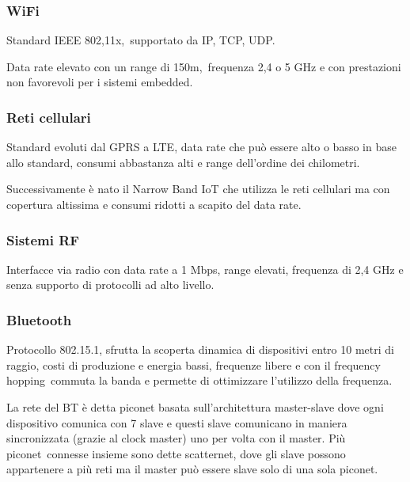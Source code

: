 \documentclass[
]{article}
\begin{document}
\subsubsection{\texorpdfstring{{WiFi}}{WiFi}}\label{h.a2b7682fwljn}

{Standard IEEE }{802,11x,}{~supportato da IP, TCP, UDP.}

{Data rate elevato con un range di }{150m,}{~frequenza 2,4 o 5 GHz e con
prestazioni non favorevoli per i sistemi embedded.}

\subsubsection{\texorpdfstring{{Reti
cellulari}}{Reti cellulari}}\label{h.r7efevy3e79i}

{Standard evoluti dal GPRS a LTE, data rate che può essere alto o basso
in base allo standard, consumi abbastanza alti e range dell'ordine dei
chilometri.}

{Successivamente è nato il Narrow Band IoT che utilizza le reti
cellulari ma con copertura altissima e consumi ridotti a scapito del
data rate.}

\subsubsection{\texorpdfstring{{Sistemi
RF}}{Sistemi RF}}\label{h.wzjt7hjt8fxp}

{Interfacce via radio con data rate a 1 Mbps, range elevati, frequenza
di 2,4 GHz e senza supporto di protocolli ad alto livello.}

\subsubsection{\texorpdfstring{{Bluetooth}}{Bluetooth}}\label{h.fy1dhv4tojr8}

{Protocollo 802.15.1, sfrutta la scoperta dinamica di dispositivi entro
10 metri di raggio, costi di produzione e energia bassi, frequenze
libere e con }{il frequency hopping}{~commuta la banda e }{permette di
ottimizzare l'utilizzo della frequenza}{.}

{La rete del BT è detta piconet basata sull'architettura master-slave
dove ogni dispositivo comunica con 7 slave e questi slave comunicano in
maniera sincronizzata (grazie al clock master) uno per volta con il
master. Più }{piconet}{~connesse insieme sono dette scatternet, dove gli
slave possono appartenere a più reti ma il master può essere slave solo
di una sola piconet.}
\end{document}
